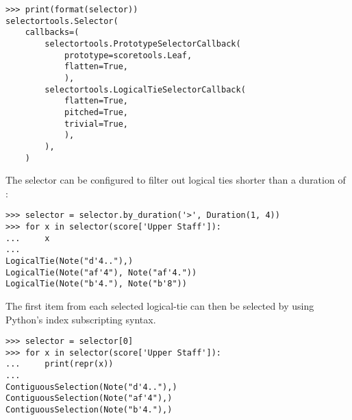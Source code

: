 \begin{abjadbookoutput}
\begin{singlespacing}
\vspace{-0.5\baselineskip}
\begin{verbatim}
>>> print(format(selector))
selectortools.Selector(
    callbacks=(
        selectortools.PrototypeSelectorCallback(
            prototype=scoretools.Leaf,
            flatten=True,
            ),
        selectortools.LogicalTieSelectorCallback(
            flatten=True,
            pitched=True,
            trivial=True,
            ),
        ),
    )
\end{verbatim}
\end{singlespacing}
\end{abjadbookoutput}

\noindent The selector can be configured to filter out logical ties shorter
than a duration of :

\begin{comment}
<abjad>
selector = selector.by_duration('>', Duration(1, 4))
for x in selector(score['Upper Staff']):
    x

</abjad>
\end{comment}

\begin{abjadbookoutput}
\begin{singlespacing}
\vspace{-0.5\baselineskip}
\begin{verbatim}
>>> selector = selector.by_duration('>', Duration(1, 4))
>>> for x in selector(score['Upper Staff']):
...     x
...
LogicalTie(Note("d'4.."),)
LogicalTie(Note("af'4"), Note("af'4."))
LogicalTie(Note("b'4."), Note("b'8"))
\end{verbatim}
\end{singlespacing}
\end{abjadbookoutput}

\noindent The first item from each selected logical-tie can then be selected by
using Python's index subscripting syntax.

\begin{comment}
<abjad>
selector = selector[0]
for x in selector(score['Upper Staff']):
    print(repr(x))

</abjad>
\end{comment}

\begin{abjadbookoutput}
\begin{singlespacing}
\vspace{-0.5\baselineskip}
\begin{verbatim}
>>> selector = selector[0]
>>> for x in selector(score['Upper Staff']):
...     print(repr(x))
...
ContiguousSelection(Note("d'4.."),)
ContiguousSelection(Note("af'4"),)
ContiguousSelection(Note("b'4."),)
\end{verbatim}
\end{singlespacing}
\end{abjadbookoutput}

